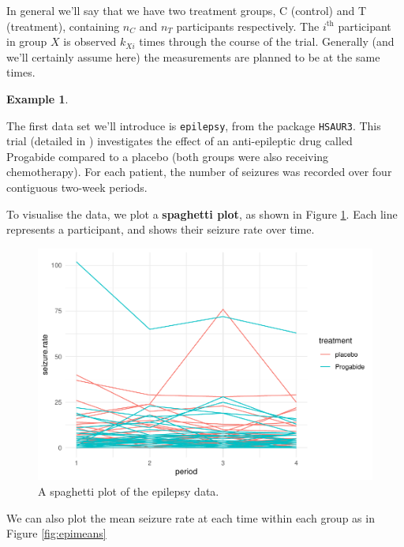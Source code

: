 \documentclass[
  openany]{book}
\theoremstyle{definition}
\theoremstyle{definition}
\newtheorem{example}{Example}[chapter]
\theoremstyle{definition}
\theoremstyle{definition}
\theoremstyle{remark}
\begin{document}
In general we'll say that we have two treatment groups, C (control) and T (treatment), containing \(n_C\) and \(n_T\) participants respectively. The \(i^{\text{th}}\) participant in group \(X\) is observed \(k_{Xi}\) times through the course of the trial. Generally (and we'll certainly assume here) the measurements are planned to be at the same times.

\begin{example}
\protect\hypertarget{exm:epilepsy1}{}\label{exm:epilepsy1}

The first data set we'll introduce is \texttt{epilepsy}, from the package \texttt{HSAUR3}. This trial (detailed in \citet{thall1990some}) investigates the effect of an anti-epileptic drug called Progabide compared to a placebo (both groups were also receiving chemotherapy). For each patient, the number of seizures was recorded over four contiguous two-week periods.

To visualise the data, we plot a \textbf{spaghetti plot}, as shown in Figure \ref{fig:epispag}. Each line represents a participant, and shows their seizure rate over time.

\begin{figure}
\centering
\includegraphics{CT4H_notes_files/figure-latex/epispag-1.pdf}
\caption{\label{fig:epispag}A spaghetti plot of the epilepsy data.}
\end{figure}

We can also plot the mean seizure rate at each time within each group as in Figure \ref{fig:epimeans}


\end{example}
\end{document}
